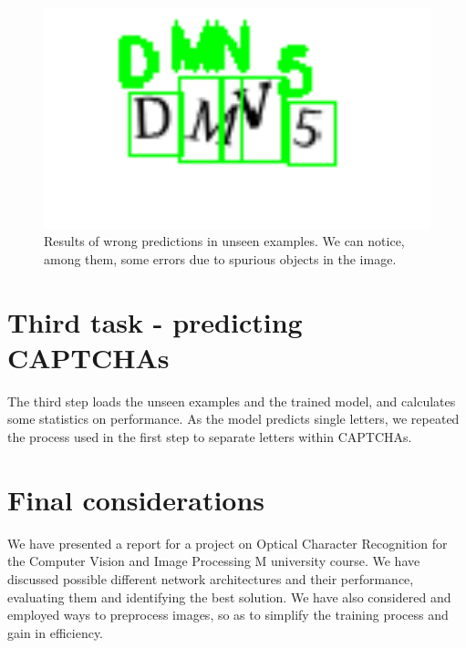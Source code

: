 \begin{figure}
\begin{minipage}{0.23\textwidth}
	\end{minipage}
	\begin{minipage}{0.23\textwidth}
		\centering
		\includegraphics[width=1\textwidth]{wronglabel_4.png} 
	\end{minipage}
	\caption{Results of wrong predictions in unseen examples. We can notice, among them, some errors due to spurious objects in the image.}
	\label{fig7-wronglabels}
\end{figure}

\vspace{1.5cm} \par
\section*{Third task - predicting CAPTCHAs}\label{third-task---predicting-captchas}
The third step loads the unseen examples and the trained model, and calculates some statistics on performance. As the model predicts single letters, we repeated the process used in the first step to separate letters within CAPTCHAs.

\vspace{1.5cm} \par
\section*{Final considerations}\label{final-considerations}
We have presented a report for a project on Optical Character Recognition for the Computer Vision and Image Processing M university course. We have discussed possible different network architectures and their performance, evaluating them and identifying the best solution. We have also considered and employed ways to preprocess images, so as to simplify the training process and gain in efficiency.

